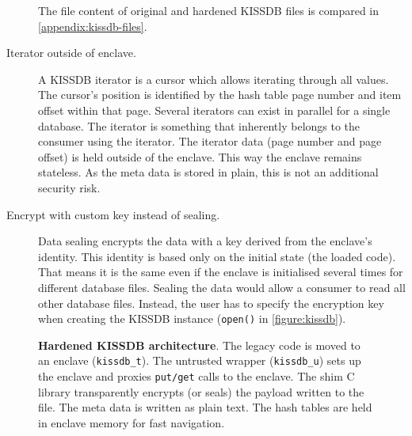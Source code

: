 \begin{description}
\begin{itemize}
\end{itemize}\label{ID_1663661427}
The file content of original and hardened KISSDB files is compared in \autoref{appendix:kissdb-files}.\label{ID_1329958020}
\item[Iterator outside of enclave.]\label{ID_1365327675}
A KISSDB iterator is a cursor which allows iterating through all values.\label{ID_1380301625}
The cursor's position is identified by the hash table page number and item offset within that page.\label{ID_574983925}
Several iterators can exist in parallel for a single database.\label{ID_1536238444}
The iterator is something that inherently belongs to the consumer using the iterator.\label{ID_1427844365}
The iterator data (page number and page offset) is held outside of the enclave.\label{ID_765057086}
This way the enclave remains stateless. As the meta data is stored in plain, this is not an additional security risk.\label{ID_706601824}
\item[Encrypt with custom key instead of sealing.]\label{ID_1242822874}
Data sealing encrypts the data with a key derived from the enclave's identity.\label{ID_683061299}
This identity is based only on the initial state (the loaded code).\label{ID_1748128877}
That means it is the same even if the enclave is initialised several times for different database files.\label{ID_1159251968}
Sealing the data would allow a consumer to read all other database files.\label{ID_536148124}
Instead, the user has to specify the encryption key when creating the KISSDB instance (\texttt{open()} in \autoref{figure:kissdb}).\label{ID_792459156}
\end{description}\label{ID_102894942}
\begin{figure}[htbp]
\makebox[\textwidth][c]{
}\caption{\textbf{Hardened KISSDB architecture}.\label{ID_1849364658}
The legacy code is moved to an enclave (\texttt{kissdb\_{}t}).\label{ID_1888630135}
The untrusted wrapper (\texttt{kissdb\_{}u}) sets up the enclave and proxies \texttt{put/get} calls to the enclave.\label{ID_586280030}
The shim C library transparently encrypts (or seals) the payload written to the file.\label{ID_655947813}
The meta data is written as plain text.\label{ID_1892225489}
The hash tables are held in enclave memory for fast navigation.\label{ID_203134686}
\label{ID_260850471}\label{figure:kissdb}}
\end{figure}



